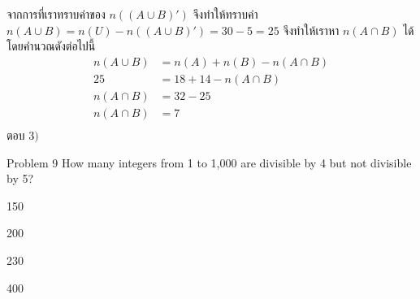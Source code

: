 \documentclass[11pt]{scrartcl}
\begin{document}
\begin{solutionbox}
\begin{center}
  \end{center}

  จากการที่เราทราบค่าของ $n((A \cup B)')$ จึงทำให้ทราบค่า $n(A \cup B) = n(U) - n((A \cup B)') = 30-5 = 25$ จึงทำให้เราหา $n(A \cap B)$ ได้โดยคำนวณดังต่อไปนี้
  \begin{align*}
    n(A \cup B ) &= n(A)+n(B)-n(A \cap B) \\
        25       &=  18+14-n(A \cap B) \\
    n(A \cap B)  &=  32-25 \\
    n(A \cap B)  &=  7 \\
  \end{align*}
  ตอบ $\boxed{3)}$
\end{solutionbox}

\begin{problembox}{Problem 9}
How many integers from 1 to 1,000 are divisible by 4 but not divisible by 5?
 
\begin{choices}
\item 150
\item 200
\item 230
\item 400
\end{choices}
\end{problembox}
\end{document}
